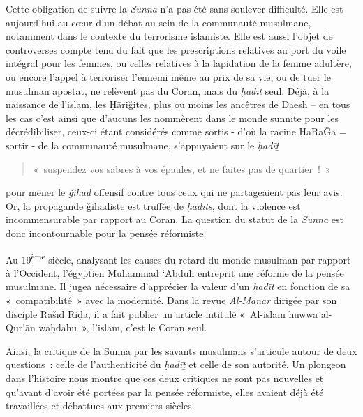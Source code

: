 Cette obligation de suivre la \emph{Sunna} n'a pas été sans soulever
difficulté. Elle est aujourd'hui au cœur d'un débat au sein de la
communauté musulmane, notamment dans le contexte du terrorisme
islamiste. Elle est aussi l'objet de controverses compte tenu du fait
que les prescriptions relatives au port du voile intégral pour les
femmes, ou celles relatives à la lapidation de la femme adultère, ou
encore l'appel à terroriser l'ennemi même au prix de sa vie, ou de tuer
le musulman apostat, ne relèvent pas du Coran, mais du \emph{ḥadīṯ}
seul. Déjà, à la naissance de l'islam, les Ḫāriğites, plus ou moins les
ancêtres de Daesh -- en tous les cas c'est ainsi que d'aucuns les
nommèrent dans le monde sunnite pour les décrédibiliser, ceux-ci étant
considérés comme sortis - d'où la racine ḪaRaǦa = sortir - de la
communauté musulmane, s'appuyaient sur le \emph{ḥadīṯ} 
\begin{quote}
    «~suspendez vos
sabres à vos épaules, et ne faites pas de quartier~!~» 
\end{quote}
pour mener le
\emph{ǧihād} offensif contre tous ceux qui ne partageaient pas leur
avis. Or, la propagande
ǧihādiste est truffée de \emph{ḥadīṯs}, dont la violence est
incommensurable par rapport au Coran. La question du statut de la
\emph{Sunna} est donc incontournable pour la pensée réformiste.

Au 19\textsuperscript{ème} siècle, analysant les causes du retard du
monde musulman par rapport à l'Occident, l'égyptien Muhammad `Abduh
entreprit une réforme de la pensée musulmane. Il jugea nécessaire
d'apprécier la valeur d'un \emph{ḥadīṯ} en fonction de sa
«~compatibilité~» avec la modernité. Dans la revue \emph{Al-Manār}
dirigée par son disciple Rašīd Riḍā, il a fait publier un article
intitulé «~Al-islām huwwa al-Qur'ān waḥdahu~», l'islam, c'est le Coran
seul.

Ainsi, la critique de la Sunna par les savants musulmans s'articule
autour de deux questions~: celle de l'authenticité du \emph{ḥadīṯ} et
celle de son autorité. Un plongeon dans l'histoire nous montre que ces
deux critiques ne sont pas nouvelles et qu'avant d'avoir été portées par
la pensée réformiste, elles avaient déjà été travaillées et débattues
aux premiers siècles.


